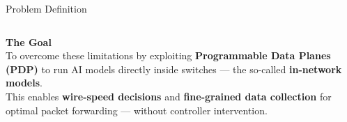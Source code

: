 {\begin{frame}{Problem Definition}
\begin{columns}[T, totalwidth=\textwidth]
  \end{columns}

  \vspace{0.20cm}

  \begin{tcolorbox}[
    enhanced,
    boxrule  = 0pt,
    colback  = solutiongreen!10,
    colframe = solutiongreen!10,
    arc      = 4pt,
    left=8pt, right=8pt, top=5pt, bottom=5pt,
    borderline west={4pt}{0pt}{solutiongreen},
  ]
    {\color{solutiongreen}\bfseries\small
      \faArrowRight\quad The Goal}
    \vspace{4pt}\\
    \footnotesize
    To overcome these limitations by exploiting
    \textbf{Programmable Data Planes (PDP)} to run
    AI models directly inside switches ---
    the so-called \textbf{in-network models}.\\[3pt]
    This enables \textbf{wire-speed decisions} and
    \textbf{fine-grained data collection} for
    optimal packet forwarding --- without
    controller intervention.
  \end{tcolorbox}

\end{frame}
}